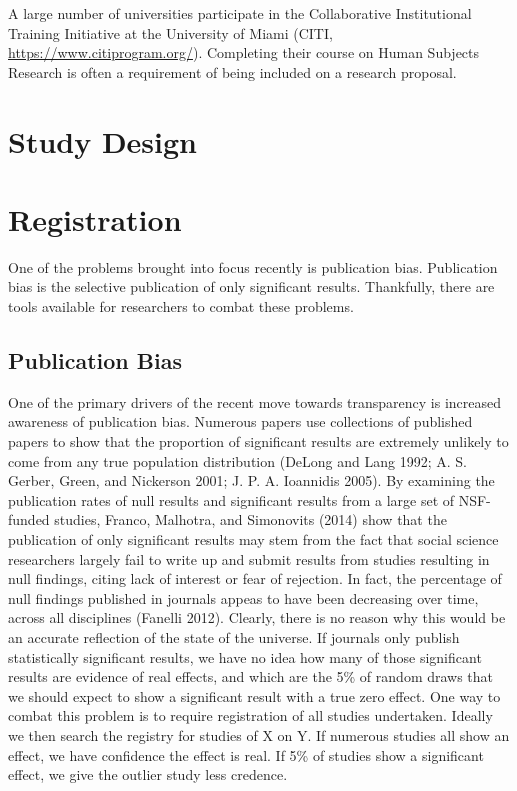 \documentclass[12pt] {article}
\begin{document}
A large number of universities participate in the Collaborative
Institutional Training Initiative at the University of Miami (CITI,
\url{https://www.citiprogram.org/}). Completing their course on Human
Subjects Research is often a requirement of being included on a research
proposal.
\section{Study Design}\label{study-design}

\section{Registration}\label{registration}

One of the problems brought into focus recently is publication bias.
Publication bias is the selective publication of only significant
results. Thankfully, there are tools available for researchers to combat
these problems.

\subsection{Publication Bias}\label{publication-bias}

One of the primary drivers of the recent move towards transparency is
increased awareness of publication bias. Numerous papers use collections
of published papers to show that the proportion of significant results
are extremely unlikely to come from any true population distribution
(DeLong and Lang 1992; A. S. Gerber, Green, and Nickerson 2001; J. P. A.
Ioannidis 2005). By examining the publication rates of null results and
significant results from a large set of NSF-funded studies, Franco,
Malhotra, and Simonovits (2014) show that the publication of only
significant results may stem from the fact that social science
researchers largely fail to write up and submit results from studies
resulting in null findings, citing lack of interest or fear of
rejection. In fact, the percentage of null findings published in
journals appeas to have been decreasing over time, across all
disciplines (Fanelli 2012). Clearly, there is no reason why this would
be an accurate reflection of the state of the universe. If journals only
publish statistically significant results, we have no idea how many of
those significant results are evidence of real effects, and which are
the 5\% of random draws that we should expect to show a significant
result with a true zero effect. One way to combat this problem is to
require registration of all studies undertaken. Ideally we then search
the registry for studies of X on Y. If numerous studies all show an
effect, we have confidence the effect is real. If 5\% of studies show a
significant effect, we give the outlier study less credence.
\end{document}
